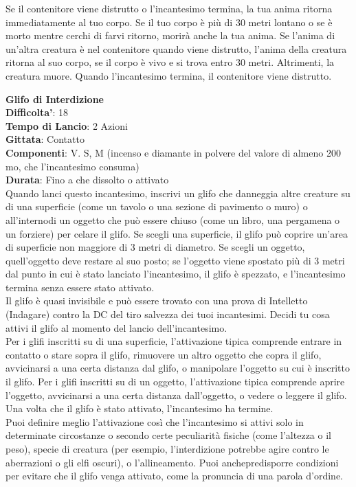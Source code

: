 \begin{multicols}{2}
Se il contenitore viene distrutto o l’incantesimo termina, la tua anima ritorna immediatamente al tuo corpo. Se il tuo corpo è più di 30 metri lontano o se è morto mentre cerchi di farvi ritorno, morirà anche la tua anima. Se l’anima di un’altra creatura è nel contenitore quando viene distrutto, l’anima della creatura ritorna al suo corpo, se il corpo è vivo e si trova entro 30 metri. Altrimenti, la creatura muore. Quando l’incantesimo termina, il contenitore viene distrutto.

\medskip\textbf{Glifo di Interdizione}\\
\textbf{Difficolta'}: 18\\
\textbf{Tempo di Lancio}: 2 Azioni\\
\textbf{Gittata}: Contatto\\
\textbf{Componenti}: V. S, M (incenso e diamante in polvere del valore di almeno 200 mo, che l’incantesimo consuma)\\
\textbf{Durata}: Fino a che dissolto o attivato \\
Quando lanci questo incantesimo, inscrivi un glifo che danneggia altre creature su di una superficie (come un tavolo o una sezione di pavimento o muro) o all’internodi un oggetto che può essere chiuso (come un libro, una pergamena o un forziere) per celare il glifo. Se scegli una superficie, il glifo può coprire un’area di superficie non maggiore di 3 metri di diametro. Se scegli un oggetto, quell’oggetto deve restare al suo posto; se l’oggetto viene spostato più di 3 metri dal punto in cui è stato lanciato l’incantesimo, il glifo è spezzato, e l’incantesimo termina senza essere stato attivato.\\
Il glifo è quasi invisibile e può essere trovato con una prova di Intelletto (Indagare) contro la DC del tiro salvezza dei tuoi incantesimi. Decidi tu cosa attivi il glifo al momento del lancio dell’incantesimo.\\
Per i glifi inscritti su di una superficie, l’attivazione tipica comprende entrare in contatto o stare sopra il glifo, rimuovere un altro oggetto che copra il glifo, avvicinarsi a una certa distanza dal glifo, o manipolare l’oggetto su cui è inscritto il glifo. Per i glifi inscritti su di un oggetto, l’attivazione tipica comprende aprire l’oggetto, avvicinarsi a una certa distanza dall’oggetto, o vedere o leggere il glifo. Una volta che il glifo è stato attivato, l’incantesimo ha termine.\\
Puoi definire meglio l’attivazione così che l’incantesimo si attivi solo in determinate circostanze o secondo certe peculiarità fisiche (come l’altezza o il peso), specie di creatura (per esempio, l’interdizione potrebbe agire contro le aberrazioni o gli elfi oscuri), o l’allineamento. Puoi anchepredisporre condizioni per evitare che il glifo  venga attivato, come la pronuncia di una parola d’ordine.\\

\end{multicols}
